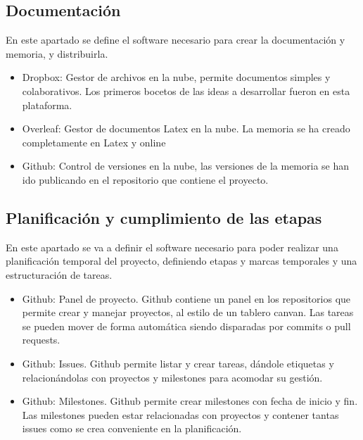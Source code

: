 \subsection{Documentación}
En este apartado se define el software necesario para crear la documentación y memoria, y distribuirla.
\begin{itemize}
    \item Dropbox: Gestor de archivos en la nube, permite documentos simples y colaborativos. Los primeros bocetos de las ideas a desarrollar fueron en esta plataforma.
    \item Overleaf: Gestor de documentos Latex en la nube. La memoria se ha creado completamente en Latex y online
    \item Github: Control de versiones en la nube, las versiones de la memoria se han ido publicando en el repositorio que contiene el proyecto.
\end{itemize}
\subsection{Planificación y cumplimiento de las etapas}
En este apartado se va a definir el software necesario para poder realizar una planificación temporal del proyecto, definiendo etapas y marcas temporales y una estructuración de tareas.
\begin{itemize}
    \item Github: Panel de proyecto. Github contiene un panel en los repositorios que permite crear y manejar proyectos, al estilo de un tablero canvan. Las tareas se pueden mover de forma automática siendo disparadas por commits o pull requests.
    \item Github: Issues. Github permite listar y crear tareas, dándole etiquetas y relacionándolas con proyectos y milestones para acomodar su gestión.
    \item Github: Milestones. Github permite crear milestones con fecha de inicio y fin. Las milestones pueden estar relacionadas con proyectos y contener tantas issues como se crea conveniente en la planificación. 
\end{itemize}
